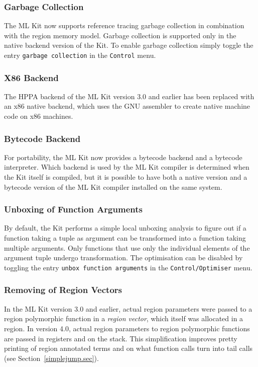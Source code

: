 \documentclass[12pt]{book}
\begin{document}
\subsubsection*{Garbage Collection}
%
The ML Kit now supports reference tracing garbage collection in
combination with the region memory model. Garbage collection is
supported only in the native backend version of the Kit. To enable
garbage collection simply toggle the entry {\tt garbage collection} in
the {\tt Control} menu.

\subsubsection*{X86 Backend}
The 
%
HPPA backend of the ML Kit version 3.0 and earlier has been replaced
with an
%
x86 native backend, which uses the GNU assembler to create native
machine code on x86 machines.

\subsubsection*{Bytecode Backend}
%
For portability, the ML Kit now provides a bytecode backend and a
bytecode interpreter. Which backend is used by the ML Kit compiler is
determined when the Kit itself is compiled, but it is possible to have
both a native version and a bytecode version of the ML Kit compiler
installed on the same system.

\subsubsection*{Unboxing of Function Arguments}
%
By default, the Kit performs a simple local unboxing analysis to
figure out if a function taking a tuple as argument can be transformed
into a function taking multiple arguments. Only functions that use
only the individual elements of the argument tuple undergo
transformation. The optimisation can be disabled by toggling the entry
{\tt unbox function arguments} in the {\tt Control/Optimiser} menu.

\subsubsection*{Removing of Region Vectors}
%
In the ML Kit version 3.0 and earlier, actual region parameters were
passed to a region polymorphic function in a {\em region vector},
which itself was allocated in a region. In version 4.0, actual region
parameters to
%
region polymorphic functions are passed in registers and on the stack.
This simplification improves pretty printing of region annotated terms
and on what function calls turn into tail calls (see
Section~\ref{simplejump.sec}).
\end{document}

